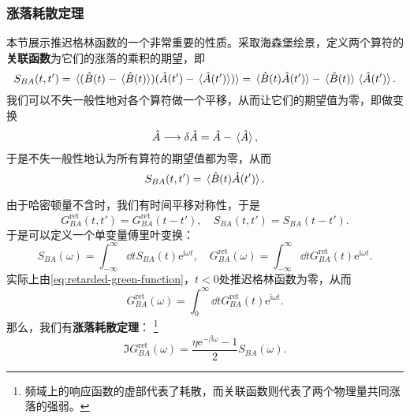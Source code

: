 \documentclass[hyperref, UTF8, a4paper]{ctexart}
\newcommand*{\ii}{\mathrm{i}}
\newcommand*{\ee}{\mathrm{e}}
\begin{document}
\subsubsection{涨落耗散定理}

本节展示推迟格林函数的一个非常重要的性质。采取海森堡绘景，定义两个算符的\textbf{关联函数}为它们的涨落的乘积的期望，即
\begin{equation}
    S_{BA}(t,t') = \expval*{(\hat{B}(t) - \expval*{\hat{B}(t)}) (\hat{A}(t') - \expval*{\hat{A}(t')})} = \expval*{\hat{B}(t)\hat{A}(t')} - \expval*{\hat{B}(t)}\expval*{\hat{A}(t')}.
\end{equation}
我们可以不失一般性地对各个算符做一个平移，从而让它们的期望值为零，即做变换
\[
    \hat{A} \longrightarrow \var{\hat{A}} = \hat{A} - \expval*{\hat{A}},
\]
于是不失一般性地认为所有算符的期望值都为零，从而
\begin{equation}
    S_{BA}(t,t') = \expval*{\hat{B}(t)\hat{A}(t')}.
\end{equation}

由于哈密顿量不含时，我们有时间平移对称性，于是
\begin{equation}
    G_{BA}^\text{ret}(t,t') = G_{BA}^\text{ret}(t-t'), \quad S_{BA}(t,t') = S_{BA}(t-t').
\end{equation}
于是可以定义一个单变量傅里叶变换：
\begin{equation}
    S_{BA}(\omega) = \int_{-\infty}^\infty \dd{t} S_{BA}(t) \ee^{\ii \omega t}, \quad G_{BA}^\text{ret}(\omega) = \int_{-\infty}^\infty \dd{t} G_{BA}^\text{ret}(t) \ee^{\ii \omega t}.
\end{equation}
实际上由\eqref{eq:retarded-green-function}，$t<0$处推迟格林函数为零，从而
\[
    G_{BA}^\text{ret}(\omega) = \int_0^\infty \dd{t} G_{BA}^\text{ret}(t) \ee^{\ii \omega t}.
\]
那么，我们有\textbf{涨落耗散定理}：%
\footnote{频域上的响应函数的虚部代表了耗散，而关联函数则代表了两个物理量共同涨落的强弱。}
\begin{equation}
    \Im G_{BA}^\text{ret}(\omega) = \frac{\eta \ee^{-\beta \omega} - 1}{2} S_{BA}(\omega).
\end{equation}
\end{document}
